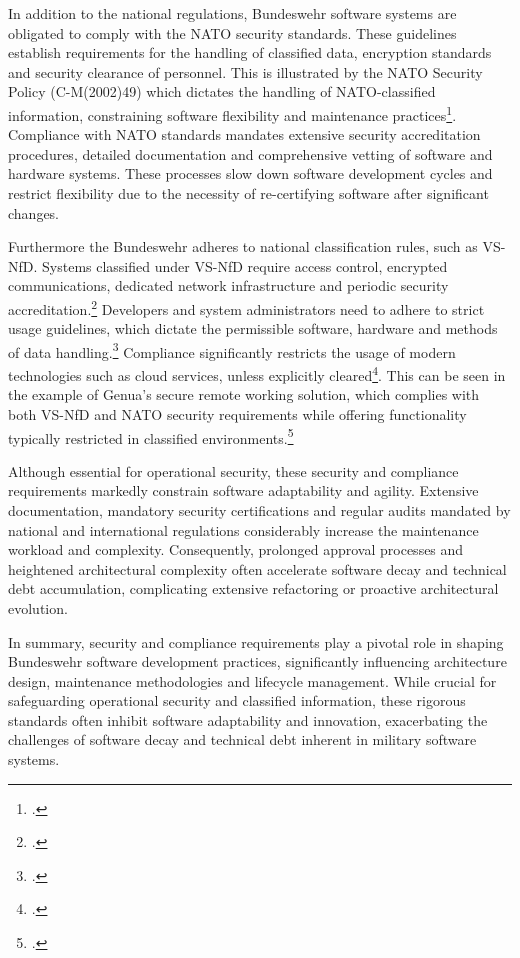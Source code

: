 In addition to the national regulations, Bundeswehr software systems are obligated to comply with the NATO security standards. These guidelines establish requirements for the handling of classified data, encryption standards and security clearance of personnel.
This is illustrated by the NATO Security Policy (C-M(2002)49) which dictates the handling of NATO-classified information, constraining software flexibility and maintenance practices\footcite[Enclosure B, pp. 1–3; Enclosure F, pp. 1–2]{NATO2002SecurityPolicy}. 
Compliance with NATO standards mandates extensive security accreditation procedures, detailed documentation and comprehensive vetting of software and hardware systems.
These processes slow down software development cycles and restrict flexibility due to the necessity of re-certifying software after significant changes.

Furthermore the Bundeswehr adheres to national classification rules, such as \ac{VS-NfD}. Systems classified under \ac{VS-NfD} require access control, encrypted communications, dedicated network infrastructure and periodic security accreditation.\footcite[see Part 2, pp. 1–3; Part 3, pp. 1–6]{BMI2010VSNFD}
Developers and system administrators need to adhere to strict usage guidelines, which dictate the permissible software, hardware and methods of data handling.\footcite[Part 3, No. 3.1–3.7, pp. 1–5]{BMI2010VSNFD} Compliance significantly restricts the usage of modern technologies such as cloud services, unless explicitly cleared\footcite[Part 3, No. 3.4.1–3.4.5, pp. 4–5]{BMI2010VSNFD}. 
This can be seen in the example of Genua’s secure remote working solution, which complies with both VS-NfD and NATO security requirements while offering functionality typically restricted in classified environments.\footcite{Genua2023VSNFD}

Although essential for operational security, these security and compliance requirements markedly constrain software adaptability and agility. 
Extensive documentation, mandatory security certifications and regular audits mandated by national and international regulations considerably increase the maintenance workload and complexity. 
Consequently, prolonged approval processes and heightened architectural complexity often accelerate software decay and technical debt accumulation, complicating extensive refactoring or proactive architectural evolution.

In summary, security and compliance requirements play a pivotal role in shaping Bundeswehr software development practices, significantly influencing architecture design, 
maintenance methodologies and lifecycle management. While crucial for safeguarding operational security and classified information, these rigorous standards often inhibit software adaptability and innovation, exacerbating the challenges of software decay and technical debt inherent in military software systems.

